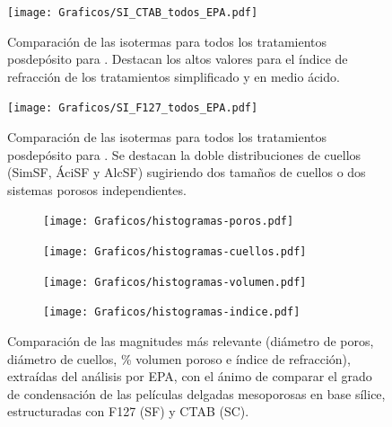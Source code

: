 			\begin{figure}[bh!]
		 	   	   \begin{center}
		 	   	   \texttt{[image: Graficos/SI\_CTAB\_todos\_EPA.pdf]}
			   	   \caption[Comparación PEA tratamientos alternativos (CTAB)]{Comparación de las isotermas para todos los tratamientos posdepósito para \pdmC. Destacan los altos valores para el índice de refracción de los tratamientos simplificado y en medio ácido.}
				   \label{fig:todos_EPA_CTAB}	
				   \end{center}
				   \end{figure}
			
			\clearpage

			\begin{figure}[th!]
		 	   	   \begin{center}
		 	   	   \texttt{[image: Graficos/SI\_F127\_todos\_EPA.pdf]}
			   	   \caption[Comparación PEA tratamientos alternativos (F127)]{Comparación de las isotermas para todos los tratamientos posdepósito para \pdmF. Se destacan la doble distribuciones de cuellos (SimSF, ÁciSF y AlcSF) sugiriendo dos tamaños de cuellos o dos sistemas porosos independientes.}
				   \label{fig:todos_EPA_F127}	
				   \end{center}
				   \end{figure}	

				   \begin{figure}[hb!]
				 	   	    
				 	   	    \begin{subfigure}[t]{0.5\textwidth}
				        	\texttt{[image: Graficos/histogramas-poros.pdf]}
				       		\end{subfigure}
				         	\begin{subfigure}[t]{0.5\textwidth}
				        	\texttt{[image: Graficos/histogramas-cuellos.pdf]}
				       		\end{subfigure}
				         	 \begin{subfigure}[t]{0.5\textwidth}
				        	\texttt{[image: Graficos/histogramas-volumen.pdf]}
				       		\end{subfigure}
				         	\begin{subfigure}[t]{0.5\textwidth}
				        	\texttt{[image: Graficos/histogramas-indice.pdf]}
				       		\end{subfigure}
				     		\caption[Comparación del grado de condensación de \pdm]{Comparación de las magnitudes más relevante (diámetro de poros, diámetro de cuellos, \% volumen poroso e índice de refracción), extraídas del análisis por EPA, con el ánimo de comparar el grado de condensación de las películas delgadas mesoporosas en base sílice, estructuradas con F127 (SF) y CTAB (SC).}
				     		\label{fig:histogramas}
				     		\end{figure}
		
